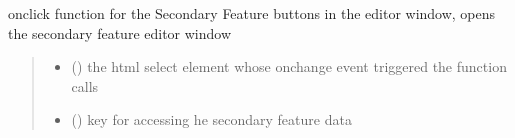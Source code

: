 \documentclass[letterpaper,10pt,english]{sphinxmanual}
\begin{document}
\begin{fulllineitems}
\label{\detokenize{docs_gui/js_api/network_editor/display_editable_network_features:openSecondaryEditor}}
\pysigstartsignatures
{}
\pysigstopsignatures
\sphinxAtStartPar
onclick function for the Secondary Feature buttons in the editor window, opens the secondary feature editor window
\begin{quote}\begin{description}
\begin{itemize}
\item {} 
\sphinxAtStartPar
{} () \textendash{} the html select element whose onchange event triggered the function calls

\item {} 
\sphinxAtStartPar
{} () \textendash{} key for accessing he secondary feature data

\end{itemize}

\end{description}\end{quote}

\end{fulllineitems}

\end{document}
